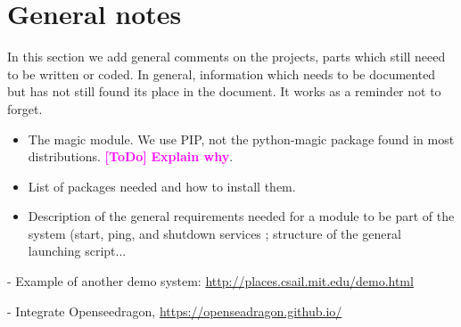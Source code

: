\documentclass[a4paper,12pt]{article}
\newcommand{\ToDo}[1]{\textcolor{magenta}{\textbf{[ToDo]} \textbf{#1}}}
\begin{document}
\tableofcontents
\newpage
\listoffigures
\newpage



























\section{General notes}
In this section we add general comments on the projects, parts which still neeed to be written or coded. In general, information which needs to be documented but has not still found its place in the document. It works as a reminder not to forget.

\begin{itemize}
  \item The magic module. We use PIP, not the python-magic package found in most distributions. \ToDo{Explain why}.
  \item List of packages needed and how to install them.
  \item Description of the general requirements needed for a module to be part of the system (start, ping, and shutdown services ; structure of the general launching script...
\end{itemize}

- Example of another demo system: \url{http://places.csail.mit.edu/demo.html}

- Integrate Openseedragon, \url{https://openseadragon.github.io/}
\end{document}

